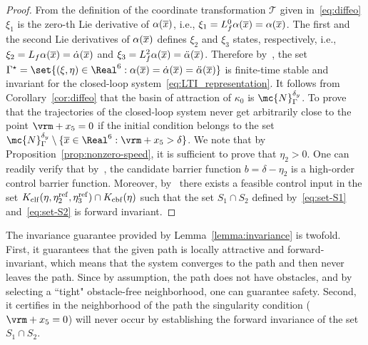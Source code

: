{{\begin{proof}
  
  From the definition of the coordinate transformation $\mathscr{T}$ given in~\eqref{eq:diffeo} $\xi_1$ is the zero-th Lie derivative of $\alpha(\overline{x})$, i.e., $\xi_1 = L_f^0\alpha(\overline{x}) = \alpha(\overline{x})$. The first and the second Lie derivatives of $\alpha(\overline{x})$ defines $\xi_2$ and $\xi_3$ states, respectively, i.e., $\xi_2 = L_f\alpha(\overline{x}) = \dot\alpha(\overline{x})$ and $\xi_3 = L_f^2\alpha(\overline{x}) = \ddot\alpha(\overline{x})$.
  Therefore by~\cite[Proposition 8.1]{bhat2005geometric}, the set $\Gamma^\star = \set{(\xi,\eta)\in\Real^6: \alpha(\agx) = \dot\alpha(\agx) = \ddot\alpha(\agx)}$ is finite-time stable and invariant for the closed-loop system~\eqref{eq:LTI_representation}. It follows from Corollary~\ref{cor:diffeo} that the basin of attraction of $\kappa_0$ is $\mc{N}_\Gamma^{\by}$. 
  To prove that the trajectories of the closed-loop system never get arbitrarily close to the point $\vrm + x_5 = 0$ if the initial condition belongs to the set $\mc{N}_\Gamma^{\by} \setminus \{\agx\in\Real^6 : \vrm + x_5 > \delta\}$. We note that by Proposition~\ref{prop:nonzero-speed}, it is sufficient to prove that $\eta_2 > 0$. One can readily verify that by~\cite[Definition 4]{XiaBelCas2022}, the candidate barrier function $b = \delta - \eta_2$ is a high-order control barrier function. Moreover, by~\cite[Theorem 2]{XiaBelCas2022} there exists a feasible control input in the set $K_{\mathrm{clf}}{(\eta, {\eta}^{\mathrm{ref}}_{2}, {\eta}^{\mathrm{ref}}_{3})} \cap K_{\mathrm{cbf}}{(\eta)} $ such that the set $S_1 \cap S_2$ defined by~\eqref{eq:set-S1} and~\eqref{eq:set-S2} is forward invariant.
  \end{proof}}
  \begin{remark}
     The invariance guarantee provided by Lemma~\ref{lemma:invariance} is twofold. First, it guarantees that the given path is locally attractive and forward-invariant, which means that the system converges to the path and then never leaves the path. Since by assumption, the path does not have obstacles, and by selecting a ``tight" obstacle-free neighborhood, one can guarantee safety. Second, it certifies in the neighborhood of the path the singularity condition ($\vrm + x_5 = 0$) will never occur by establishing the forward invariance of the set $S_1 \cap S_2$. 
  \end{remark}

}